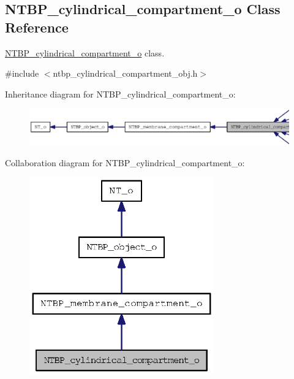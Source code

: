 \subsection{NTBP\_\-cylindrical\_\-compartment\_\-o Class Reference}
\label{class_n_t_b_p__cylindrical__compartment__o}


\hyperlink{class_n_t_b_p__cylindrical__compartment__o}{NTBP\_\-cylindrical\_\-compartment\_\-o} class.  




{\ttfamily \#include $<$ntbp\_\-cylindrical\_\-compartment\_\-obj.h$>$}



Inheritance diagram for NTBP\_\-cylindrical\_\-compartment\_\-o:
\nopagebreak
\begin{figure}[H]
\begin{center}
\leavevmode
\includegraphics[width=400pt]{class_n_t_b_p__cylindrical__compartment__o__inherit__graph}
\end{center}
\end{figure}


Collaboration diagram for NTBP\_\-cylindrical\_\-compartment\_\-o:
\nopagebreak
\begin{figure}[H]
\begin{center}
\leavevmode
\includegraphics[width=226pt]{class_n_t_b_p__cylindrical__compartment__o__coll__graph}
\end{center}
\end{figure}
